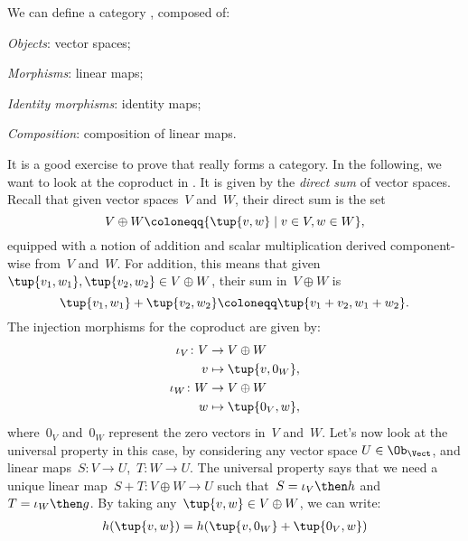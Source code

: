 \begin{example}
    We can define a category \iindex{\Vect}, composed of:
    \begin{compactitem}
        \item \emph{Objects}: vector spaces;
        \item \emph{Morphisms}: linear maps;
        \item \emph{Identity morphisms}: identity maps;
        \item \emph{Composition}: composition of linear maps.
    \end{compactitem}
    It is a good exercise to prove that \Vect really forms a category. In the following, we want to look at the coproduct in \Vect. It is given by the \emph{direct sum} of vector spaces. Recall that given vector spaces~$V$ and~$W$, their direct sum is the set
    \begin{equation*}
        V\oplus W\coloneqq \{\tup{v,w}\mid v\in V,w\in W\},
    \end{equation*}
    equipped with a notion of addition and scalar multiplication derived component-wise from~$V$ and~$W$. For addition, this means that given~$\tup{v_1,w_1},\tup{v_2,w_2}\in V\oplus W$, their sum in~$V \oplus W$ is
    \begin{equation*}
        \tup{v_1,w_1}+\tup{v_2,w_2}\coloneqq \tup{v_1+v_2,w_1+w_2}.
    \end{equation*}
    The injection morphisms for the coproduct are given by:
    \begin{equation*}
        \begin{aligned}
            \iota_V\colon V&\to V\oplus W\\
            v&\mapsto \tup{v,0_W},\\
            \iota_W\colon W&\to V\oplus W\\
            w&\mapsto \tup{0_V,w},
        \end{aligned}
    \end{equation*}
    where~$0_V$ and~$0_W$ represent the zero vectors in~$V$ and~$W$. Let's now look at the universal property in this case, by considering any vector space $U\in \Ob_\Vect$, and linear maps~$S\colon V\to U$,~$T\colon W\to U$. The universal property says that we need a unique linear map~$S+T\colon V\oplus W \to U$ such that~$S=\iota_V\then h$ and~$T=\iota_W\then g$. By taking any~$\tup{v,w}\in V\oplus W$, we can write:
    \begin{equation*}
        \begin{aligned}
            h(\tup{v,w})&=h(\tup{v,0_W}+\tup{0_V,w})\\

\end{aligned}
\end{equation*}
\end{example}
